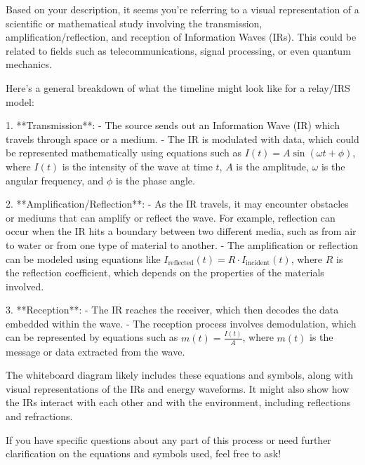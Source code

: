 Based on your description, it seems you're referring to a visual representation of a scientific or mathematical study involving the transmission, amplification/reflection, and reception of Information Waves (IRs). This could be related to fields such as telecommunications, signal processing, or even quantum mechanics.

Here's a general breakdown of what the timeline might look like for a relay/IRS model:

1. **Transmission**: 
   - The source sends out an Information Wave (IR) which travels through space or a medium.
   - The IR is modulated with data, which could be represented mathematically using equations such as \( I(t) = A \sin(\omega t + \phi) \), where \( I(t) \) is the intensity of the wave at time \( t \), \( A \) is the amplitude, \( \omega \) is the angular frequency, and \( \phi \) is the phase angle.

2. **Amplification/Reflection**:
   - As the IR travels, it may encounter obstacles or mediums that can amplify or reflect the wave. For example, reflection can occur when the IR hits a boundary between two different media, such as from air to water or from one type of material to another.
   - The amplification or reflection can be modeled using equations like \( I_{\text{reflected}}(t) = R \cdot I_{\text{incident}}(t) \), where \( R \) is the reflection coefficient, which depends on the properties of the materials involved.

3. **Reception**:
   - The IR reaches the receiver, which then decodes the data embedded within the wave.
   - The reception process involves demodulation, which can be represented by equations such as \( m(t) = \frac{I(t)}{A} \), where \( m(t) \) is the message or data extracted from the wave.

The whiteboard diagram likely includes these equations and symbols, along with visual representations of the IRs and energy waveforms. It might also show how the IRs interact with each other and with the environment, including reflections and refractions.

If you have specific questions about any part of this process or need further clarification on the equations and symbols used, feel free to ask!